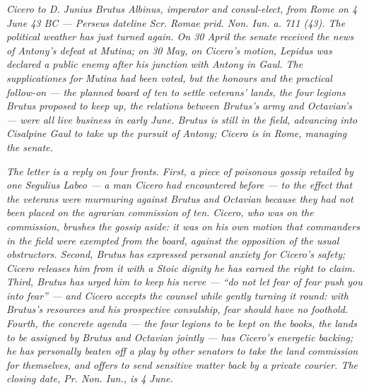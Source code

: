
\textit{Cicero to D. Junius Brutus Albinus, imperator and
consul-elect, from Rome on 4 June 43 BC --- Perseus dateline
\textit{Scr. Romae prid. Non. Iun. a. 711 (43)}. The
political weather has just turned again. On 30 April the
senate received the news of Antony's defeat at Mutina; on
30 May, on Cicero's motion, Lepidus was declared a public
enemy after his junction with Antony in Gaul. The
\textit{supplicationes} for Mutina had been voted, but the
honours and the practical follow-on --- the planned board
of ten to settle veterans' lands, the four legions Brutus
proposed to keep up, the relations between Brutus's army
and Octavian's --- were all live business in early June.
Brutus is still in the field, advancing into Cisalpine Gaul
to take up the pursuit of Antony; Cicero is in Rome,
managing the senate.}

\textit{The letter is a reply on four fronts. First, a piece
of poisonous gossip retailed by one Segulius Labeo --- a
man Cicero had encountered before --- to the effect that
the veterans were murmuring against Brutus and Octavian
because they had not been placed on the agrarian
commission of ten. Cicero, who \textit{was} on the
commission, brushes the gossip aside: it was on his own
motion that commanders in the field were exempted from the
board, against the opposition of the usual obstructors.
Second, Brutus has expressed personal anxiety for Cicero's
safety; Cicero releases him from it with a Stoic dignity
he has earned the right to claim. Third, Brutus has urged
him to keep his nerve --- ``do not let fear of fear push
you into fear'' --- and Cicero accepts the counsel while
gently turning it round: with Brutus's resources and his
prospective consulship, fear should have no foothold.
Fourth, the concrete agenda --- the four legions to be
kept on the books, the lands to be assigned by Brutus and
Octavian jointly --- has Cicero's energetic backing; he
has personally beaten off a play by other senators to take
the land commission for themselves, and offers to send
sensitive matter back by a private courier. The closing
date, \textit{Pr. Non. Iun.}, is 4 June.}

